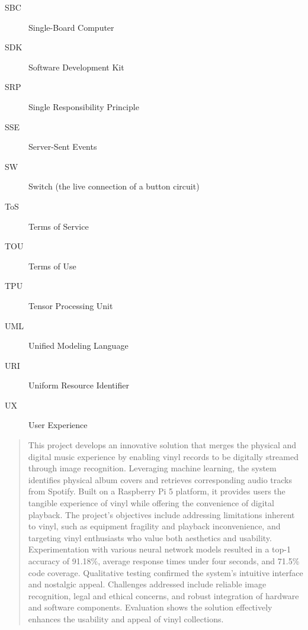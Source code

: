 \begin{description}
        \item[SBC] Single-Board Computer
        \item[SDK] Software Development Kit
        \item[SRP] Single Responsibility Principle
        \item[SSE] Server-Sent Events
        \item[SW] Switch (the live connection of a button circuit) 
        \item[ToS] Terms of Service
        \item[TOU] Terms of Use
        \item[TPU] Tensor Processing Unit 
        \item[UML] Unified Modeling Language
        \item[URI] Uniform Resource Identifier
        \item[UX] User Experience
      \end{description}
    
    \begin{abstract} %
    
        This project develops an innovative solution that merges the physical and digital music experience by enabling vinyl records to be digitally streamed through image recognition. Leveraging machine learning, the system identifies physical album covers and retrieves corresponding audio tracks from Spotify. Built on a Raspberry Pi 5 platform, it provides users the tangible experience of vinyl while offering the convenience of digital playback. The project's objectives include addressing limitations inherent to vinyl, such as equipment fragility and playback inconvenience, and targeting vinyl enthusiasts who value both aesthetics and usability. Experimentation with various neural network models resulted in a top-1 accuracy of 91.18\%, average response times under four seconds, and 71.5\% code coverage. Qualitative testing confirmed the system's intuitive interface and nostalgic appeal. Challenges addressed include reliable image recognition, legal and ethical concerns, and robust integration of hardware and software components. Evaluation shows the solution effectively enhances the usability and appeal of vinyl collections.
    
    \end{abstract}%
    \clearpage
    
    
    
    \uomdeclarations %
    
